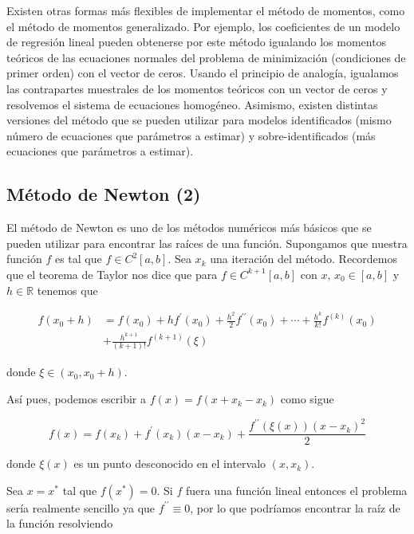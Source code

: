 \documentclass[9pt,twocolumn,twoside,]{pnas-new}
\begin{document}
Existen otras formas más flexibles de implementar el método de momentos,
como el método de momentos generalizado. Por ejemplo, los coeficientes
de un modelo de regresión lineal pueden obtenerse por este método
igualando los momentos teóricos de las ecuaciones normales del problema
de minimización (condiciones de primer orden) con el vector de ceros.
Usando el principio de analogía, igualamos las contrapartes muestrales
de los momentos teóricos con un vector de ceros y resolvemos el sistema
de ecuaciones homogéneo. Asimismo, existen distintas versiones del
método que se pueden utilizar para modelos identificados (mismo número
de ecuaciones que parámetros a estimar) y sobre-identificados (más
ecuaciones que parámetros a estimar).

\hypertarget{muxe9todo-de-newton-ascher2011first}{%
\subsection{Método de Newton
(2)}\label{muxe9todo-de-newton-ascher2011first}}

El método de Newton es uno de los métodos numéricos más básicos que se
pueden utilizar para encontrar las raíces de una función. Supongamos que
nuestra función \(f\) es tal que \(f \in C^2[a,b]\). Sea \(x_k\) una
iteración del método. Recordemos que el teorema de Taylor nos dice que
para \(f \in C^{k+1}[a,b]\) con \(x, \, x_0 \in [a,b]\) y
\(h\in\mathbb{R}\) tenemos que

\begin{equation*}
    \begin{aligned}
        f\left(x_{0}+h\right) &=f\left(x_{0}\right)+h f^{\prime}\left(x_{0}\right)+\frac{h^{2}}{2} f^{\prime \prime}\left(x_{0}\right)+\cdots+\frac{h^{k}}{k !} f^{(k)}\left(x_{0}\right) \\
        &+\frac{h^{k+1}}{(k+1) !} f^{(k+1)}(\xi)
    \end{aligned}
\end{equation*}

donde \(\xi \in(x_0,x_0+h)\).

Así pues, podemos escribir a \(f(x)=f(x+x_k-x_k)\) como sigue

\[
    f(x)=f\left(x_{k}\right)+f^{\prime}\left(x_{k}\right)\left(x-x_{k}\right)+\frac{f^{\prime \prime}(\xi(x))\left(x-x_{k}\right)^{2}}{2} 
\]

donde \(\xi(x)\) es un punto desconocido en el intervalo \((x,x_k)\).

Sea \(x=x^*\) tal que \(f(x^*)=0\). Si \(f\) fuera una función lineal
entonces el problema sería realmente sencillo ya que
\(f^{\prime\prime}\equiv0\), por lo que podríamos encontrar la raíz de
la función resolviendo
\end{document}
